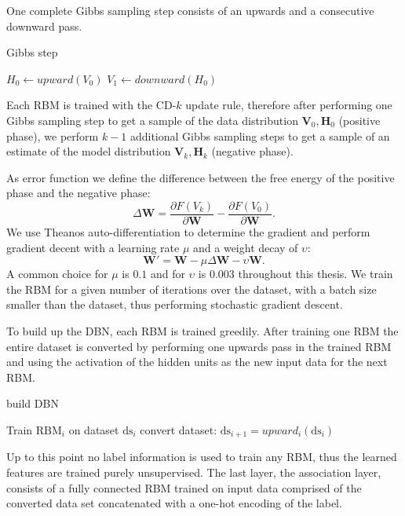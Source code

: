 One complete Gibbs sampling step consists of an upwards and a consecutive downward pass.

\begin{algorithm}
\caption{Gibbs step}
\begin{algorithmic}
\State $H_0 \gets upward(V_0) $  
\State $V_1 \gets downward(H_0) $  
\end{algorithmic}
\end{algorithm}

Each RBM is trained with the CD-$k$ update rule, therefore after performing one Gibbs sampling step to get a sample of the data distribution $\textbf{V}_0, \textbf{H}_0$  (positive phase), we perform $k-1$ additional Gibbs sampling steps to get a sample of an estimate of the model distribution $\textbf{V}_k, \textbf{H}_k$  (negative phase).

As error function we define the difference between the free energy of the positive phase and the negative phase:
\[
\Delta \textbf{W} = \frac{\partial F(V_k)}{\partial \textbf{W}} -  \frac{\partial F(V_0)}{\partial \textbf{W}} .
\]
We use Theanos auto-differentiation to determine the gradient and perform gradient decent with a learning rate $\mu$ and a weight decay of $\upsilon$:
\[
\textbf{W}' = \textbf{W} - \mu \Delta \textbf{W} - \upsilon \textbf{W} .
\]
A common choice for $\mu$ is $0.1$ and for $\upsilon$ is $0.003$ throughout this thesis.
We train the RBM for a given number of iterations over the dataset, with a batch size smaller than the dataset, thus performing stochastic gradient descent.

To build up the DBN, each RBM is trained greedily.
After training one RBM the entire dataset is converted by performing one upwards pass in the trained RBM and using the activation of the hidden units as the new input data for the next RBM.

\begin{algorithm}
\caption{build DBN}
\begin{algorithmic}
\State Train $\text{RBM}_i$ on dataset $\text{ds}_i$
\State convert dataset: $\text{ds}_{i+1} = upward_i(\text{ds}_i)$ 
\EndFor
\end{algorithmic}
\end{algorithm}

Up to this point no label information is used to train any RBM, thus the learned features are trained purely unsupervised.
The last layer, the association layer, consists of a fully connected RBM trained on input data comprised of the converted data set concatenated with a one-hot encoding of the label.



